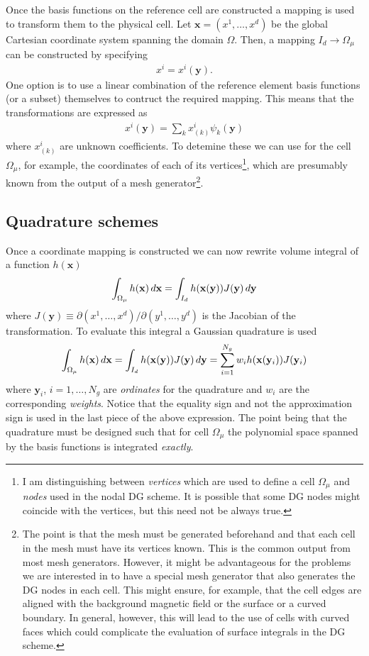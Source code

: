 \documentclass[11pt, reqno]{amsart}
\newcommand{\mvec}[1]{\mathbf{#1}}
\theoremstyle{definition}
\begin{document}
Once the basis functions on the reference cell are constructed a
mapping is used to transform them to the physical cell. Let $\mvec{x}
= (x^1,\ldots,x^d)$ be the global Cartesian coordinate system spanning
the domain $\Omega$. Then, a mapping $I_d\rightarrow \Omega_\mu$ can
be constructed by specifying
\begin{align}
  x^i = x^i(\mvec{y}).
\end{align}
One option is to use a linear combination of the reference element
basis functions (or a subset) themselves to contruct the required
mapping. This means that the transformations are expressed as
\begin{align}
  x^i(\mvec{y}) = \sum_k x^i_{(k)} \psi_k(\mvec{y})
\end{align}
where $x^i_{(k)}$ are unknown coefficients. To detemine these we can
use for the cell $\Omega_\mu$, for example, the coordinates of each of
its vertices\footnote{I am distinguishing between \emph{vertices}
  which are used to define a cell $\Omega_\mu$ and \emph{nodes} used
  in the nodal DG scheme. It is possible that some DG nodes might
  coincide with the vertices, but this need not be always true.},
which are presumably known from the output of a mesh
generator\footnote{The point is that the mesh must be generated
  beforehand and that each cell in the mesh must have its vertices
  known. This is the common output from most mesh generators. However,
  it might be advantageous for the problems we are interested in to
  have a special mesh generator that also generates the DG nodes in
  each cell. This might ensure, for example, that the cell edges are
  aligned with the background magnetic field or the surface or a
  curved boundary. In general, however, this will lead to the use of
  cells with curved faces which could complicate the evaluation of
  surface integrals in the DG scheme.}.

\subsection{Quadrature schemes}

Once a coordinate mapping is constructed we can now rewrite volume
integral of a function $h(\mvec{x})$ 
\begin{align}
  \int_{\Omega_\mu}h(\mvec{x})\thinspace d\mvec{x} 
  =
  \int_{I_d}
  h(\mvec{x}(\mvec{y})) J(\mvec{y}) \thinspace d\mvec{y}
\end{align}
where $J(\mvec{y}) \equiv \partial (x^1,\ldots,x^d)/\partial
(y^1,\ldots,y^d)$ is the Jacobian of the transformation. To evaluate
this integral a Gaussian quadrature is used
\begin{align}
  \int_{\Omega_\mu}
  h(\mvec{x})\thinspace d\mvec{x} 
  =
  \int_{I_d}
  h(\mvec{x}(\mvec{y})) J(\mvec{y}) \thinspace d\mvec{y}
  =
  \sum_{i=1}^{N_g} w_ih(\mvec{x}(\mvec{y}_i)) J(\mvec{y}_i)
\end{align}
where $\mvec{y}_i$, $i=1,\ldots,N_g$ are \emph{ordinates} for the
quadrature and $w_i$ are the corresponding \emph{weights}. Notice that
the equality sign and not the approximation sign is used in the last
piece of the above expression. The point being that the quadrature
must be designed such that for cell $\Omega_\mu$ the polynomial space
spanned by the basis functions is integrated \emph{exactly}.
\end{document}
